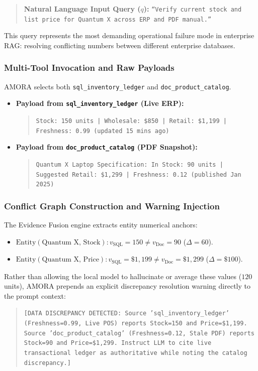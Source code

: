 \begin{quote}
\textbf{Natural Language Input Query ($q$):}  
\texttt{``Verify current stock and list price for Quantum X across ERP and PDF manual.''}
\end{quote}

This query represents the most demanding operational failure mode in enterprise RAG: resolving conflicting numbers between different enterprise databases.

\subsubsection{Multi-Tool Invocation and Raw Payloads}
AMORA selects both \texttt{sql\_inventory\_ledger} and \texttt{doc\_product\_catalog}.
\begin{itemize}
    \item \textbf{Payload from \texttt{sql\_inventory\_ledger} (Live ERP):}
    \begin{quote}
        \texttt{Stock: 150 units | Wholesale: \$850 | Retail: \$1,199 | Freshness: 0.99 (updated 15 mins ago)}
    \end{quote}
    \item \textbf{Payload from \texttt{doc\_product\_catalog} (PDF Snapshot):}
    \begin{quote}
        \texttt{Quantum X Laptop Specification: In Stock: 90 units | Suggested Retail: \$1,299 | Freshness: 0.12 (published Jan 2025)}
    \end{quote}
\end{itemize}

\subsubsection{Conflict Graph Construction and Warning Injection}
The Evidence Fusion engine extracts entity numerical anchors:
\begin{itemize}
    \item $\text{Entity}(\text{Quantum X}, \, \text{Stock}): v_{\text{SQL}} = 150 \neq v_{\text{Doc}} = 90$ ($\Delta = 60$).
    \item $\text{Entity}(\text{Quantum X}, \, \text{Price}): v_{\text{SQL}} = \$1,199 \neq v_{\text{Doc}} = \$1,299$ ($\Delta = \$100$).
\end{itemize}
Rather than allowing the local model to hallucinate or average these values ($120$ units), AMORA prepends an explicit discrepancy resolution warning directly to the prompt context:
\begin{quote}
    \texttt{[DATA DISCREPANCY DETECTED: Source 'sql\_inventory\_ledger' (Freshness=0.99, Live POS) reports Stock=150 and Price=\$1,199. Source 'doc\_product\_catalog' (Freshness=0.12, Stale PDF) reports Stock=90 and Price=\$1,299. Instruct LLM to cite live transactional ledger as authoritative while noting the catalog discrepancy.]}
\end{quote}

